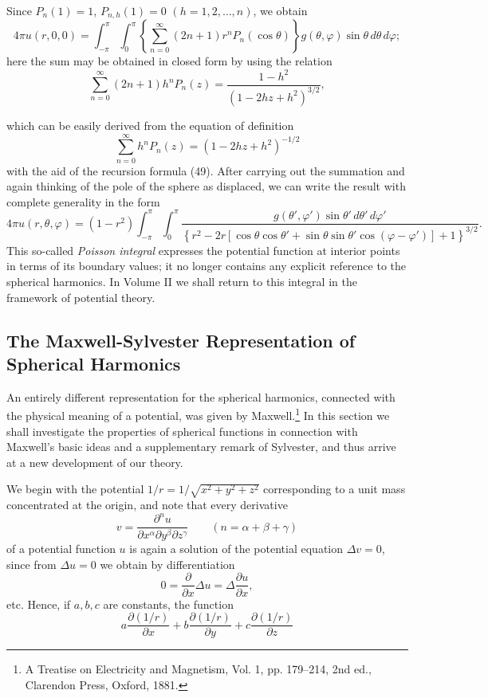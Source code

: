 Since $P_n(1)=1$, $P_{n,h}(1)=0$ $(h=1,2,\ldots,n)$, we obtain
\[
4\pi u(r,0,0)=\int_{-\pi}^{\pi}\int_0^\pi
\left\{\sum_{n=0}^{\infty}(2n+1)r^nP_n(\cos\theta)\right\}
g(\theta,\varphi)\sin\theta\,d\theta\,d\varphi;
\]
here the sum may be obtained in closed form by using the relation
\[
\sum_{n=0}^{\infty}(2n+1)h^nP_n(z)=\frac{1-h^2}{(1-2hz+h^2)^{3/2}},
\]

which can be easily derived from the equation of definition
\[
\sum_{n=0}^{\infty}h^nP_n(z)=(1-2hz+h^2)^{-1/2}
\]
with the aid of the recursion formula (49). After carrying out the summation and again thinking of the pole of the sphere as displaced, we can write the result with complete generality in the form
\begin{equation}\tag{76}
4\pi u(r,\theta,\varphi)
=(1-r^2)\int_{-\pi}^{\pi}\int_0^\pi
\frac{g(\theta',\varphi')\sin\theta'\,d\theta'\,d\varphi'}
{\left\{r^2-2r[\cos\theta\cos\theta'+\sin\theta\sin\theta'\cos(\varphi-\varphi')]+1\right\}^{3/2}}.
\end{equation}
This so-called \emph{Poisson integral} expresses the potential function at interior points in terms of its boundary values; it no longer contains any explicit reference to the spherical harmonics. In Volume II we shall return to this integral in the framework of potential theory.

\subsection{The Maxwell-Sylvester Representation of Spherical Harmonics}
An entirely different representation for the spherical harmonics, connected with the physical meaning of a potential, was given by Maxwell.\footnote{A Treatise on Electricity and Magnetism, Vol. 1, pp. 179--214, 2nd ed., Clarendon Press, Oxford, 1881.} In this section we shall investigate the properties of spherical functions in connection with Maxwell's basic ideas and a supplementary remark of Sylvester, and thus arrive at a new development of our theory.

We begin with the potential $1/r=1/\sqrt{x^2+y^2+z^2}$ corresponding to a unit mass concentrated at the origin, and note that every derivative
\[
v=\frac{\partial^n u}{\partial x^\alpha\partial y^\beta\partial z^\gamma}
\qquad(n=\alpha+\beta+\gamma)
\]
of a potential function $u$ is again a solution of the potential equation $\Delta v=0$, since from $\Delta u=0$ we obtain by differentiation
\[
0=\frac{\partial}{\partial x}\Delta u=\Delta\frac{\partial u}{\partial x},
\]
etc. Hence, if $a,b,c$ are constants, the function
\[
a\frac{\partial(1/r)}{\partial x}
+b\frac{\partial(1/r)}{\partial y}
+c\frac{\partial(1/r)}{\partial z}
\]


